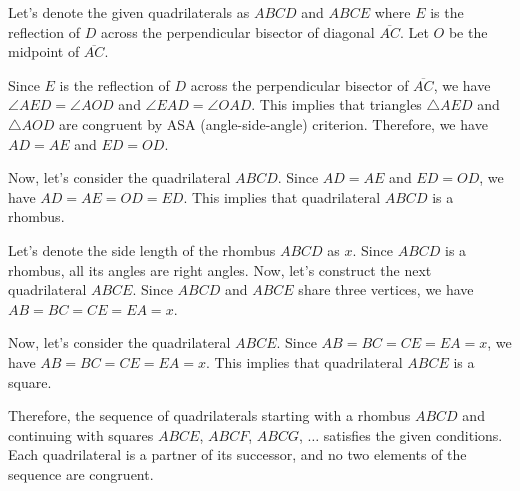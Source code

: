 Let's denote the given quadrilaterals as $ABCD$ and $ABCE$ where $E$ is the reflection of $D$ across the perpendicular bisector of diagonal $\overline{AC}$. Let $O$ be the midpoint of $\overline{AC}$.

Since $E$ is the reflection of $D$ across the perpendicular bisector of $\overline{AC}$, we have $\angle AED = \angle AOD$ and $\angle EAD = \angle OAD$. This implies that triangles $\triangle AED$ and $\triangle AOD$ are congruent by ASA (angle-side-angle) criterion. Therefore, we have $AD = AE$ and $ED = OD$.

Now, let's consider the quadrilateral $ABCD$. Since $AD = AE$ and $ED = OD$, we have $AD = AE = OD = ED$. This implies that quadrilateral $ABCD$ is a rhombus.

Let's denote the side length of the rhombus $ABCD$ as $x$. Since $ABCD$ is a rhombus, all its angles are right angles. Now, let's construct the next quadrilateral $ABCE$. Since $ABCD$ and $ABCE$ share three vertices, we have $AB = BC = CE = EA = x$. 

Now, let's consider the quadrilateral $ABCE$. Since $AB = BC = CE = EA = x$, we have $AB = BC = CE = EA = x$. This implies that quadrilateral $ABCE$ is a square.

Therefore, the sequence of quadrilaterals starting with a rhombus $ABCD$ and continuing with squares $ABCE$, $ABCF$, $ABCG$, $\ldots$ satisfies the given conditions. Each quadrilateral is a partner of its successor, and no two elements of the sequence are congruent.
